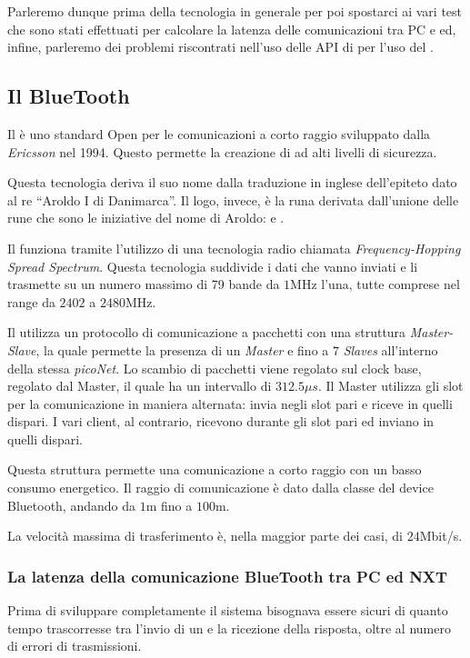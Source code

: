 Parleremo dunque prima della tecnologia in generale per poi spostarci ai
vari test che sono stati effettuati per calcolare la latenza delle
comunicazioni tra PC e \SPAM{} ed, infine, parleremo dei problemi
riscontrati nell'uso delle API di \nxtOSEK{} per l'uso del
.

\subsection{Il BlueTooth}
Il  è uno standard Open per le comunicazioni a corto
raggio sviluppato dalla \emph{Ericsson} nel 1994. Questo permette la creazione di
 ad alti livelli di sicurezza.

Questa tecnologia deriva il suo nome dalla traduzione in inglese
dell'epiteto dato al re ``Aroldo I di Danimarca''. Il logo, invece, è la
runa derivata dall'unione delle rune che sono le iniziative del nome di
Aroldo:  e .

Il  funziona tramite l'utilizzo di una tecnologia radio
chiamata \emph{Frequency-Hopping Spread Spectrum}. Questa tecnologia
suddivide i dati che vanno inviati e li trasmette su un numero massimo di
79 bande da $1$MHz l'una, tutte comprese nel range da $2402$ a $2480$MHz.

Il  utilizza un protocollo di comunicazione a pacchetti
con una struttura \emph{Master-Slave}, la quale permette la presenza di un
\emph{Master} e fino a $7$ \emph{Slaves} all'interno della stessa
\emph{picoNet}. Lo scambio di pacchetti viene regolato sul clock base,
regolato dal Master, il quale ha un intervallo di $312.5\mu{}s$. Il Master
utilizza gli slot per la comunicazione in maniera alternata: invia negli
slot pari e riceve in quelli dispari. I vari client, al contrario, ricevono
durante gli slot pari ed inviano in quelli dispari.

Questa struttura permette una comunicazione a corto raggio con un basso
consumo energetico. Il raggio di comunicazione è dato dalla classe del
device Bluetooth, andando da $1$m fino a $100$m.

La velocità massima di trasferimento è, nella maggior parte dei casi, di
$24$Mbit/s.

\subsubsection{La latenza della comunicazione BlueTooth tra PC ed
NXT}\label{sec:BROTooth} 
Prima di sviluppare completamente il sistema bisognava essere sicuri di
quanto tempo trascorresse tra l'invio di un \BROFist{} e la ricezione della
risposta, oltre al numero di errori di trasmissioni.

